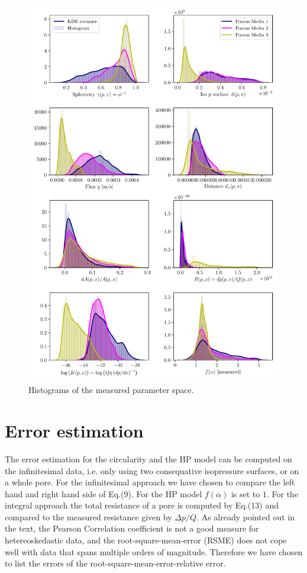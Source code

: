 \documentclass[draft,jgrga]{agutexSI2019}
\begin{document}
\begin{figure}
\noindent\includegraphics[width=15cm]{figures/histograms_parameter_space.pdf}
\caption{Histograms of the measured parameter space. }
\end{figure}

\section{Error estimation}
The error estimation for the circularity and the HP model can be computed on the infinitesimal data, i.e. only using two consequative isopressure surfaces, or on a whole pore. For the infinitesimal approach we have chosen to compare the left hand and right hand side of Eq.(9). For the HP model $f(\alpha)$ is set to $1$. For the integral approach the total resistance of a pore is computed by Eq.(13) and compared to the measured resistance given by $\Delta p/Q$. As already pointed out in the text, the Pearson Correlation coefficient is not a good measure for hetereoskedastic data, and the root-square-mean-error (RSME) does not cope well with data that spans multiple orders of magnitude. Therefore we have chosen to list the errors of the root-square-mean-error-relative error. 
\end{document}

